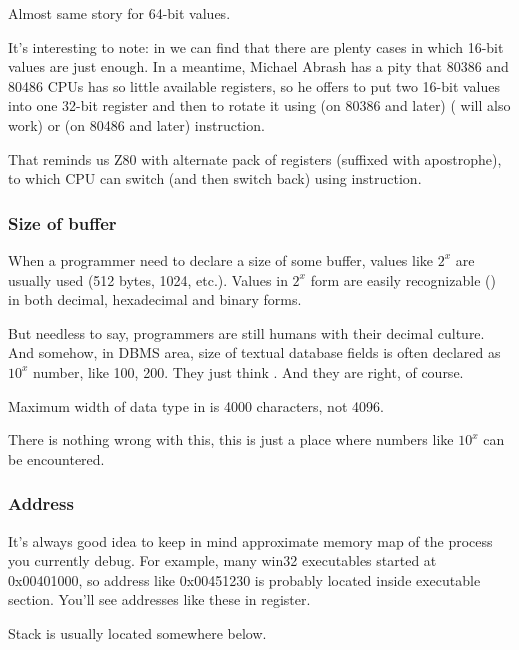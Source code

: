 Almost same story for 64-bit values.


It's interesting to note: in 
we can find that there are plenty cases in which 16-bit values are just enough.
In a meantime, Michael Abrash has a pity that 80386 and 80486 CPUs has so little available registers, so he offers to put
two 16-bit values into one 32-bit register and then to rotate it using
 (on 80386 and later) ( will also work) or 
 (on 80486 and later) instruction.

That reminds us Z80 with alternate pack of registers (suffixed with apostrophe), to which CPU can switch
(and then switch back) using  instruction.

\subsubsection{Size of buffer}

When a programmer need to declare a size of some buffer, values like $2^x$ are usually used (512 bytes, 1024, etc.).
Values in $2^x$ form are easily recognizable () in both decimal, hexadecimal and binary forms.

But needless to say, programmers are still humans with their decimal culture.
And somehow, in \ac{DBMS} area, size of textual database fields is often declared as $10^x$ number, like 100, 200.
They just think .
And they are right, of course.

Maximum width of  data type in \oracle is 4000 characters, not 4096.

There is nothing wrong with this, this is just a place where numbers like $10^x$ can be encountered.

\subsubsection{Address}

It's always good idea to keep in mind approximate memory map of the process you currently debug.
For example, many win32 executables started at 0x00401000, so address like 0x00451230 is probably located inside
executable section. You'll see addresses like these in  register.

Stack is usually located somewhere below. %

